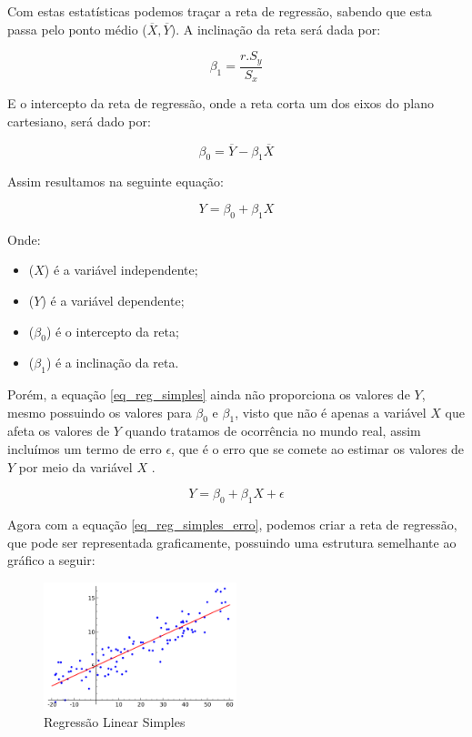 \documentclass[
    12pt,               %
    openright,          %
    oneside,            %
    a4paper,            %
    english,            %
    brazil              %
    ]{abntex2}
\begin{document}
Com estas estatísticas podemos traçar a reta de regressão, sabendo que esta passa pelo ponto médio
($\overline{X}, \overline{Y}$). A inclinação da reta será dada por:

\begin{equation}
    \label{inclinacao_reta}
    \beta_1 = \frac{r.S_y}{S_x}
\end{equation}

E o intercepto da reta de regressão, onde a reta corta um dos eixos do plano cartesiano, 
será dado por:

\begin{equation}
    \label{intercepto_reta}
    \beta_0 = \overline{Y} - \beta_1 \overline{X}
\end{equation}

Assim resultamos na seguinte equação:

\begin{equation}
\label{eq_reg_simples}
    Y = \beta_0 + \beta_1X
\end{equation}

Onde:
\begin{itemize}
    \item ($X$) é a variável independente;
    \item ($Y$) é a variável dependente;
    \item ($\beta_0$) é o intercepto da reta;
    \item ($\beta_1$) é a inclinação da reta. 
\end{itemize}

Porém, a equação \ref{eq_reg_simples} ainda não proporciona os valores de $Y$, mesmo possuindo
os valores para $\beta_0$ e $\beta_1$, visto que não é apenas a variável  $X$ que afeta os valores de
$Y$ quando tratamos de ocorrência no mundo real, assim incluímos um termo de erro $\epsilon$, que é
o erro que se comete ao estimar os valores de $Y$ por meio da variável $X$ \cite{modelos_regressao_linear}.

\begin{equation}
    \label{eq_reg_simples_erro}
    Y = \beta_0 + \beta_1X + \epsilon
\end{equation}

Agora com a equação \ref{eq_reg_simples_erro}, podemos criar a reta de regressão, que pode ser
representada graficamente, possuindo uma estrutura semelhante ao gráfico a seguir:

\begin{figure}[H]
    \centering
    \caption{\label{Regressão Linear Simples}Regressão Linear Simples}
    \includegraphics[width=0.50\textwidth]{../imgs/reg_linear_simples.png}
\end{figure}
\end{document}
